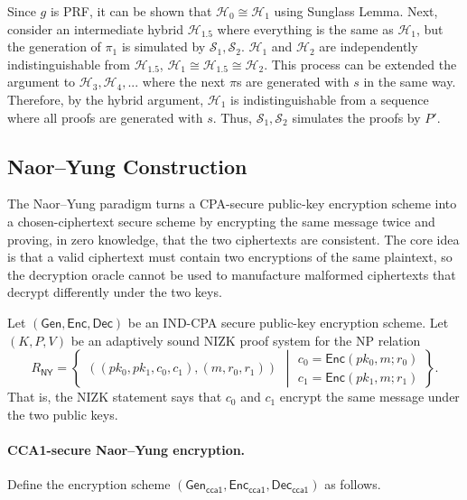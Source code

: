 Since $g$ is PRF, it can be shown that $\mathcal{H}_0 \cong \mathcal{H}_1$ using Sunglass Lemma. Next, consider an intermediate hybrid $\mathcal{H}_{1.5}$ where everything is the same as $\mathcal{H}_1$, but the generation of $\pi_1$ is simulated by $\mathcal{S}_1, \mathcal{S}_2$. $\mathcal{H}_1$ and $\mathcal{H}_2$ are independently indistinguishable from $\mathcal{H}_{1.5}$, $\mathcal{H}_1 \cong \mathcal{H}_{1.5} \cong \mathcal{H}_2$. This process can be extended the argument to $\mathcal{H}_3, \mathcal{H}_4,...$ where the next $\pi$s are generated with $s$ in the same way. Therefore, by the hybrid argument, $\mathcal{H}_1$ is indistinguishable from a sequence where all proofs are generated with $s$. Thus, $\mathcal{S}_1, \mathcal{S}_2$ simulates the proofs by $P'$.



\subsection{Naor--Yung Construction}

The Naor--Yung paradigm turns a CPA-secure public-key encryption scheme into a
chosen-ciphertext secure scheme by encrypting the same message twice and proving,
in zero knowledge, that the two ciphertexts are consistent. The core idea is that
a valid ciphertext must contain two encryptions of the same plaintext, so the
decryption oracle cannot be used to manufacture malformed ciphertexts that
decrypt differently under the two keys.

Let $(\mathsf{Gen},\mathsf{Enc},\mathsf{Dec})$ be an IND-CPA secure public-key
encryption scheme. Let $(K,P,V)$ be an adaptively sound NIZK proof system for the
NP relation
\[
R_{\mathsf{NY}}
=
\left\{
\begin{array}{c}
((pk_0,pk_1,c_0,c_1),(m,r_0,r_1))
\end{array}
\middle|
\begin{array}{l}
c_0=\mathsf{Enc}(pk_0,m;r_0) \\
c_1=\mathsf{Enc}(pk_1,m;r_1)
\end{array}
\right\}.
\]
That is, the NIZK statement says that $c_0$ and $c_1$ encrypt the same message
under the two public keys.

\paragraph{CCA1-secure Naor--Yung encryption.}

Define the encryption scheme
$(\mathsf{Gen}_{\mathsf{cca1}},\mathsf{Enc}_{\mathsf{cca1}},\mathsf{Dec}_{\mathsf{cca1}})$
as follows.

